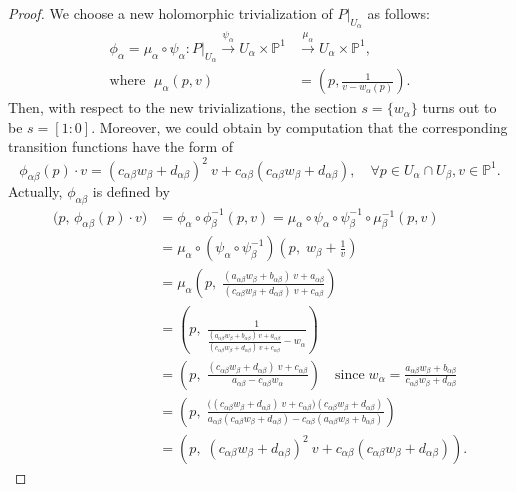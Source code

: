 \documentclass[12pt]{article}
\begin{document}
\begin{proof}
We choose a new holomorphic trivialization of $P|_{U_{\alpha}}$ as follows:
\begin{align*}
\phi_{\alpha} = \mu_{\alpha} \circ \psi_{\alpha} \colon P|_{U_{\alpha}} \xrightarrow{\psi_{\alpha}} U_{\alpha} \times \mathbb{P}^1 &\xrightarrow{\mu_{\alpha}} U_{\alpha} \times \mathbb{P}^1, \\
\text{where } \; \mu_{\alpha}(p, v) &= \left(p, \frac{1}{v - w_{\alpha}(p)}\right).
\end{align*}
Then, with respect to the new trivializations, the section $s=\{w_\alpha\}$ turns out to be $s = [1:0]$. Moreover,  we could obtain by computation that the corresponding transition functions have the form of
\[ \phi_{\alpha \beta}(p) \cdot v = (c_{\alpha \beta}w_{\beta} + d_{\alpha \beta})^{2} \ v + c_{\alpha \beta}(c_{\alpha \beta}w_{\beta} + d_{\alpha \beta}), \quad \forall p \in U_{\alpha} \cap U_{\beta}, v \in \mathbb{P}^{1}.\]
Actually, $\phi_{\alpha \beta}$ is defined by
\begin{align*}
\big(p, \, \phi_{\alpha \beta}(p) \cdot v \big) &= \phi_{\alpha} \circ \phi_{\beta}^{-1}(p, v) = \mu_{\alpha} \circ \psi_{\alpha} \circ \psi_{\beta}^{-1} \circ \mu_{\beta}^{-1}(p, v) \\
&= \mu_{\alpha} \circ (\psi_{\alpha} \circ \psi_{\beta}^{-1}) \left( p, \; w_{\beta} + \frac{1}{v} \right) \\
&= \mu_{\alpha} \left( p,\; \frac{(a_{\alpha \beta} w_{\beta} + b_{\alpha \beta}) \ v + a_{\alpha \beta}}{(c_{\alpha \beta} w_{\beta} + d_{\alpha \beta}) \ v + c_{\alpha \beta}} \right) \\
&= \left( p, \; \frac{1}{\frac{(a_{\alpha \beta} w_{\beta} + b_{\alpha \beta}) \ v + a_{\alpha \beta}}{(c_{\alpha \beta} w_{\beta} + d_{\alpha \beta}) \ v + c_{\alpha \beta}} - w_{\alpha} }\right) \\
&= \left( p, \; \frac{(c_{\alpha \beta} w_{\beta} + d_{\alpha \beta}) \ v + c_{\alpha \beta}}{a_{\alpha \beta} - c_{\alpha \beta} w_{\alpha}} \right) \quad \text{since} \; w_{\alpha} = \frac{a_{\alpha\beta}w_{\beta} + b_{\alpha\beta}}{c_{\alpha\beta}w_{\beta} + d_{\alpha\beta}} \\
&= \left( p, \; \frac{ \big( (c_{\alpha \beta} w_{\beta} + d_{\alpha \beta}) \ v + c_{\alpha \beta} \big) (c_{\alpha \beta} w_{\beta} + d_{\alpha \beta})}{a_{\alpha \beta} (c_{\alpha \beta} w_{\beta} + d_{\alpha \beta}) - c_{\alpha \beta} (a_{\alpha\beta}w_{\beta} + b_{\alpha\beta})} \right) \\
&= \left( p, \; (c_{\alpha \beta}w_{\beta} + d_{\alpha \beta})^{2} \ v + c_{\alpha \beta}(c_{\alpha \beta}w_{\beta} + d_{\alpha \beta}) \right).
\end{align*}


\end{proof}
\end{document}
